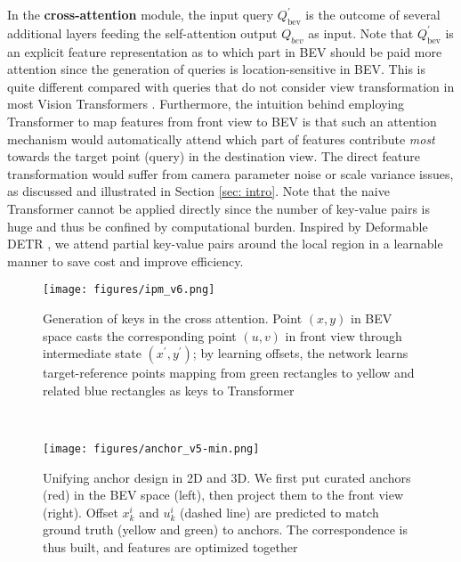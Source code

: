 \documentclass[runningheads]{llncs}
\begin{document}
In the \textbf{cross-attention} module, the input query $Q^{'}_{\text{bev}}$ is the outcome of several additional layers feeding the self-attention output $Q_{bev}$ as input.
{Note that $Q^{'}_{\text{bev}}$ is an explicit feature representation as to which part in BEV should be paid more attention since the generation of queries is location-sensitive in BEV.}
This is quite different compared with 
queries 
{that do not consider view transformation} 
in most Vision Transformers \cite{wang2022detr3d,guan2022m3detr,zhu2021deformable}. 
Furthermore,
the intuition behind employing Transformer to map features from front view to BEV is that such an attention mechanism would automatically attend which part of features contribute \textit{most} towards the {target point (query) in the destination view.}
The direct feature transformation would suffer from camera parameter noise or scale variance issues, as discussed and illustrated in Section \ref{sec: intro}.
Note that the naive Transformer cannot be applied directly since the number of key-value pairs is huge and thus be confined by computational burden.
Inspired by Deformable DETR \cite{zhu2021deformable}, we attend partial key-value pairs around the local region in a learnable manner to save cost and improve efficiency.




\begin{figure}[t]
\begin{minipage}[b]{.49\textwidth}
  \centering
  \texttt{[image: figures/ipm\_v6.png]}
  \caption{
 Generation of keys in the cross attention. 
 Point $(x,y)$ in BEV space casts the corresponding point $(u,v)$ in front view through intermediate state $(x^{'},y^{'})$; by learning offsets,
the network learns target-reference points mapping
 {from green rectangles to yellow and related blue rectangles}
 as keys to Transformer
}
  \label{fig:transformer} 
\end{minipage}
~~~~
\begin{minipage}[b]{.49\textwidth}
  \centering
  \texttt{[image: figures/anchor\_v5-min.png]}
   \caption{Unifying anchor design in 2D and 3D. 
We first put curated anchors (red) in the BEV space (left), then project them to the front view (right). Offset $x_k^{i}$ and $u_k^{i}$ (dashed line) are predicted to match ground truth (yellow and green) to anchors. The correspondence is thus built, and features are optimized together
}
  \label{fig:anchor} 
\end{minipage}
\end{figure}
\end{document}
